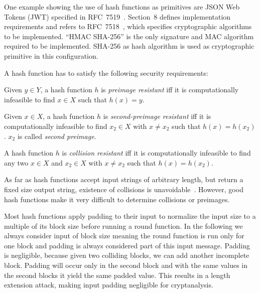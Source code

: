 One example showing the use of hash functions as primitives are JSON Web Tokens (JWT)
specified in RFC~7519~\cite{rfc7519}. Section~8 defines implementation requirements
and refers to RFC~7518~\cite{rfc7518}, which specifies cryptographic algorithms to
be implemented. \enquote{HMAC SHA-256} is the only signature and MAC algorithm
required to be implemented. SHA-256 as hash algorithm is used as cryptographic
primitive in this configuration.

A hash function has to satisfy the following security requirements:

\begin{defi}
  Given $y \in Y$,
  a hash function $h$ is \emph{preimage resistant} iff it is computationally infeasible
  to find $x \in X$ such that $h(x) = y$.
\end{defi}

\begin{defi}
  Given $x \in X$,
  a hash function $h$ is \emph{second-preimage resistant} iff it is computationally infeasible
  to find $x_2 \in X$ with $x \neq x_2$ such that $h(x) = h(x_2)$.
  $x_2$ is called \emph{second preimage}.
\end{defi}

\begin{defi}
  A hash function $h$ is \emph{collision resistant} iff it is computationally infeasible to
  find any two $x \in X$ and $x_2 \in X$ with $x \neq x_2$ such that $h(x) = h(x_2)$.
\end{defi}

As far as hash functions accept input strings of arbitrary length, but return a fixed
size output string, existence of collisions is unavoidable~\cite{schlaffer}.
However, good hash functions make it very difficult to determine collisions or preimages.

Most hash functions apply padding to their input to normalize the input size to a multiple
of its block size before running a round function. In the following we always consider
input of block size meaning the round function is run only for one block and padding is
always considered part of this input message. Padding is negligible, because given two
colliding blocks, we can add another incomplete block. Padding will occur only in the
second block and with the same values in the second blocks it yield the same padded value.
This results in a length extension attack, making input padding negligible for cryptanalysis.


